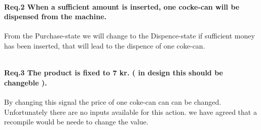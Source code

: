 \paragraph{Req.2 When a sufficient amount is inserted, one cocke-can will be dispensed from the machine.} From the Purchase-state we will change to the Dispence-state if sufficient money has been inserted, that will lead to the dispence of one coke-can.

\begin{lstlisting}[caption={[VHDL]eks. text }]

\end{lstlisting}
  
\paragraph{Req.3 The product is fixed to 7 kr. ( in design this should be changeble ).} By changing this signal the price of one coke-can can can be changed. Unfortunately there are no inputs available for this action. we have agreed that a recompile would be neede to change the value. 
\begin{lstlisting}[caption={[VHDL]eks. text }]

\end{lstlisting}



